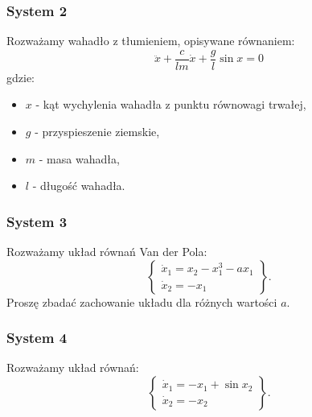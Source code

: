 \documentclass{article}
\begin{document}
        \subsubsection{System 2}
        Rozważamy wahadło z tłumieniem, opisywane równaniem:
        \begin{equation}\label{eq:posrednia_2}
            \ddot{x} + \frac{c}{lm}\dot{x} + \frac{g}{l}\sin{x} = 0
        \end{equation}
        gdzie:
        \begin{itemize}
            \item $x$ - kąt wychylenia wahadła z punktu równowagi trwałej,
            \item $g$ - przyspieszenie ziemskie,
            \item $m$ - masa wahadła,
            \item $l$ - długość wahadła.
        \end{itemize}

        \subsubsection{System 3}
        Rozważamy układ równań Van der Pola:
        \begin{equation}
            \label{eq:posrednia_3}
            \left\{
            \begin{array}{l}
                 \dot{x}_{1} = x_{2} - x_{1}^{3} - ax_{1}\\
                 \dot{x}_{2} = -x_{1}
            \end{array}
            \right\}.
        \end{equation}
        Proszę zbadać zachowanie układu dla różnych wartości $a$.

        \subsubsection{System 4}
        Rozważamy układ równań:
        \begin{equation}
            \label{eq:posrednia_4}
            \left\{
            \begin{array}{l}
                 \dot{x}_{1} = -x_{1} + \sin{x_{2}}\\
                 \dot{x}_{2} = -x_{2}
            \end{array}
            \right\}.
        \end{equation}
\end{document}
